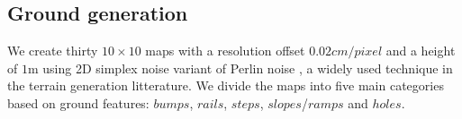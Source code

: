 \documentclass[../document.tex]{subfiles}
\begin{document}
\subsection{Ground generation}
\label{subsec: heightmap-generation}
We create thirty $10\times10$ maps with a resolution offset $0.02cm/pixel$ and a height of $1$m using 2D simplex noise variant of Perlin noise \cite{perlin}, a widely used technique in the terrain generation litterature. We divide the maps into five main categories based on ground features: $bumps$, $rails$, $steps$, $slopes$/$ramps$ and $holes$. 
\end{document}

